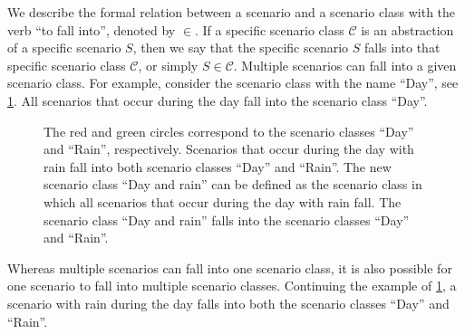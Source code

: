 We describe the formal relation between a scenario and a scenario class with the verb ``to fall into'', denoted by $\in$. If a specific scenario class $\mathcal{C}$ is an abstraction of a specific scenario $S$, then we say that the specific scenario $S$ falls into that specific scenario class $\mathcal{C}$, or simply $S \in \mathcal{C}$. Multiple scenarios can fall into a given scenario class. For example, consider the scenario class with the name ``Day'', see \cref{fig:venn diagram scenario class}. All scenarios that occur during the day fall into the scenario class ``Day''.

\setlength{\venncircle}{7em}
\begin{figure}
	\centering
	\caption{The red and green circles correspond to the scenario classes ``Day'' and ``Rain'', respectively. Scenarios that occur during the day with rain fall into both scenario classes ``Day'' and ``Rain''. The new scenario class ``Day and rain'' can be defined as the scenario class in which all scenarios that occur during the day with rain fall. The scenario class ``Day and rain'' falls into the scenario classes ``Day'' and ``Rain''.}
	\label{fig:venn diagram scenario class}
\end{figure}

Whereas multiple scenarios can fall into one scenario class, it is also possible for one scenario to fall into multiple scenario classes. Continuing the example of \cref{fig:venn diagram scenario class}, a scenario with rain during the day falls into both the scenario classes ``Day'' and ``Rain''.

